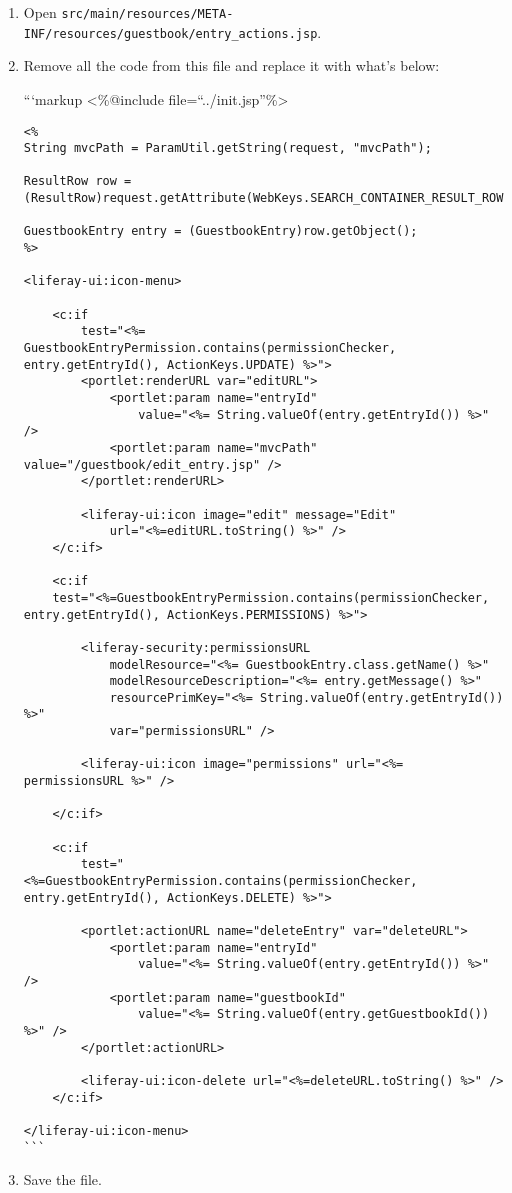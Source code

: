 \begin{enumerate}
\def\labelenumi{\arabic{enumi}.}
\item
  Open
  \texttt{src/main/resources/META-INF/resources/guestbook/entry\_actions.jsp}.
\item
  Remove all the code from this file and replace it with what's below:

  ```markup \textless\%@include file=``../init.jsp''\%\textgreater{}

\begin{verbatim}
<%
String mvcPath = ParamUtil.getString(request, "mvcPath");

ResultRow row = (ResultRow)request.getAttribute(WebKeys.SEARCH_CONTAINER_RESULT_ROW);

GuestbookEntry entry = (GuestbookEntry)row.getObject(); 
%>

<liferay-ui:icon-menu>

    <c:if
        test="<%= GuestbookEntryPermission.contains(permissionChecker, entry.getEntryId(), ActionKeys.UPDATE) %>">
        <portlet:renderURL var="editURL">
            <portlet:param name="entryId"
                value="<%= String.valueOf(entry.getEntryId()) %>" />
            <portlet:param name="mvcPath" value="/guestbook/edit_entry.jsp" />
        </portlet:renderURL>

        <liferay-ui:icon image="edit" message="Edit"
            url="<%=editURL.toString() %>" />
    </c:if>

    <c:if
    test="<%=GuestbookEntryPermission.contains(permissionChecker, entry.getEntryId(), ActionKeys.PERMISSIONS) %>">

        <liferay-security:permissionsURL
            modelResource="<%= GuestbookEntry.class.getName() %>"
            modelResourceDescription="<%= entry.getMessage() %>"
            resourcePrimKey="<%= String.valueOf(entry.getEntryId()) %>"
            var="permissionsURL" />

        <liferay-ui:icon image="permissions" url="<%= permissionsURL %>" />

    </c:if>

    <c:if
        test="<%=GuestbookEntryPermission.contains(permissionChecker, entry.getEntryId(), ActionKeys.DELETE) %>">

        <portlet:actionURL name="deleteEntry" var="deleteURL">
            <portlet:param name="entryId"
                value="<%= String.valueOf(entry.getEntryId()) %>" />
            <portlet:param name="guestbookId"
                value="<%= String.valueOf(entry.getGuestbookId()) %>" />
        </portlet:actionURL>

        <liferay-ui:icon-delete url="<%=deleteURL.toString() %>" />
    </c:if>

</liferay-ui:icon-menu>
```
\end{verbatim}
\item
  Save the file.
\end{enumerate}

